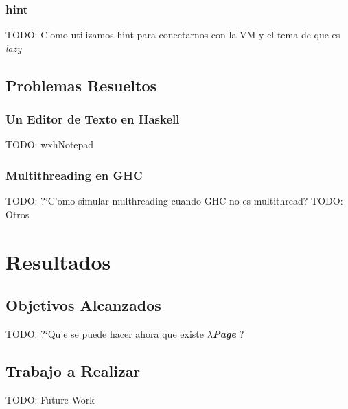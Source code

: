 \documentclass[a4paper]{article}
\newcommand{\hpage}{\textbf{\textsl{$\lambda$Page}} }
\begin{document}
\subsubsection{hint}TODO: C'omo utilizamos hint para conectarnos con la VM y el tema de que es \textsl{lazy}
\subsection{Problemas Resueltos}
\subsubsection{Un Editor de Texto en Haskell}TODO: wxhNotepad
\subsubsection{Multithreading en GHC}TODO: ?`C'omo simular multhreading cuando GHC no es multithread?
TODO: Otros

\section{Resultados}
\subsection{Objetivos Alcanzados}TODO: ?`Qu'e se puede hacer ahora que existe \hpage?
\subsection{Trabajo a Realizar} TODO: Future Work


\end{document}

